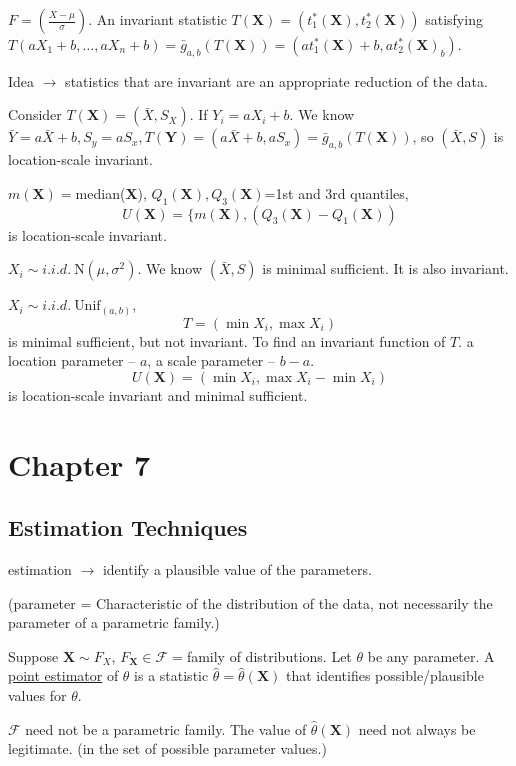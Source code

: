 \documentclass[english, 11pt]{article}
\begin{document}
\begin{exmp}
$F=\left(\frac{X-\mu}{\sigma}\right)$. An invariant statistic $T(\bm{X})=(t_1^*(\bm{X}), t_2^*(\bm{X}))$ satisfying $T(aX_1+b, \dots, aX_n+b)=\bar{g}_{a, b}(T(\bm{X}))=(at_1^*(\bm{X})+b, at_2^*(\bm{X})_b)$.

Idea $\rightarrow$ statistics that are invariant are an appropriate reduction of the data.
\end{exmp}


\begin{exmp}
Consider $T(\bm{X})=(\bar{X}, S_X)$. If $Y_i=aX_i+b$. We know $\bar{Y}=a\bar{X}+b, S_y=aS_x, T(\bm{Y})=(a\bar{X}+b, aS_x)=\bar{g}_{a,b}(T(\bm{X}))$, so $(\bar{X}, S)$ is location-scale invariant.
\end{exmp}


\begin{exmp}
$m(\bm{X})=$median($\bm{X}$), $Q_1(\bm{X}), Q_3(\bm{X})$=1st and 3rd quantiles, 
$$
U(\bm{X})=\{m(\bm{X}), (Q_3(\bm{X})-Q_1(\bm{X}))
$$
is location-scale invariant.
\end{exmp}

\begin{exmp}
$X_i\sim i.i.d.~\text{N}(\mu, \sigma^2)$. We know $(\bar{X}, S)$ is minimal sufficient. It is also invariant.
\end{exmp}

\begin{exmp}
$X_i\sim i.i.d.~\text{Unif}_{(a, b)}$,
$$
T=(\min X_i, \max X_i)
$$
is minimal sufficient, but not invariant. To find an invariant function of $T$. a location parameter -- $a$, a scale parameter -- $b-a$.
$$
U(\bm{X})=(\min X_i, \max X_i-\min X_i)
$$
is location-scale invariant and minimal sufficient.
\end{exmp}

\section{Chapter 7}
\subsection{Estimation Techniques}
estimation $\rightarrow$ identify a plausible value of the parameters.

(parameter = Characteristic of the distribution of the data, not necessarily the parameter of a parametric family.)


\begin{defn}\label{defn:31}
Suppose $\bm{X}\sim F_X$, $F_{\bm{X}}\in\mathscr{F}=$family of distributions. Let $\theta$ be any parameter. A \underline{point estimator} of $\theta$ is a statistic $\hat{\theta}=\hat{\theta}(\bm{X})$ that identifies possible/plausible values for $\theta$.
\end{defn}
\begin{note}
$\mathscr{F}$ need not be a parametric family. The value of $\hat{\theta}(\bm{X})$ need not always be legitimate. (in the set of possible parameter values.)
\end{note}
\end{document}
